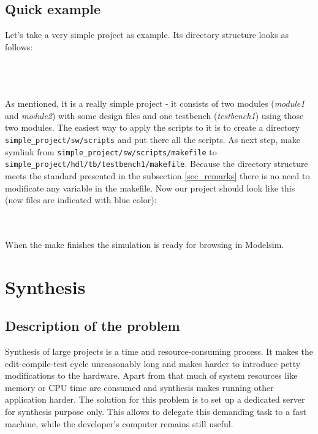 \documentclass[a4paper,10pt]{article}
\begin{document}
\subsection{Quick example}
Let's take a very simple project as example. Its directory structure looks as follows: \\
\\
\begin{minipage}{\linewidth}
\small{
\nopagebreak
{}
}
\normalsize
\end{minipage}
\\\\
As mentioned, it is a really simple project - it consists of two modules (\textit{module1} and \textit{module2}) with some design files and one testbench (\textit{testbench1}) using those two modules.
The easiest way to apply the scripts to it is to create a directory \verb!simple_project/sw/scripts! and put there all the scripts. As next step, make symlink from \verb!simple_project/sw/scripts/makefile! to \verb!simple_project/hdl/tb/testbench1/makefile!. Because the directory structure meets the standard presented in the subsection \ref{sec_remarks} there is no need to modificate any variable in the makefile. Now our project should look like this (new files are indicated with blue color):\\
\begin{minipage}{\linewidth}
\small{
}
\end{minipage}
\normalsize
\\\\
When the make finishes the simulation is ready for browsing in Modelsim.
\section{Synthesis}
\subsection{Description of the problem}
Synthesis of large projects is a time and resource-consuming process. It makes the edit-compile-test cycle unreasonably long and makes harder to introduce petty modifications to the hardware. Apart from that much of system resources like memory or CPU time are consumed and synthesis makes running other application harder. The solution for this problem is to set up a dedicated server for synthesis purpose only. This allows to delegate this demanding task to a fast machine, while the developer's computer remains still useful.
\end{document}
